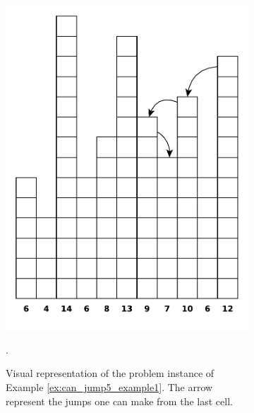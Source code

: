 \begin{figure}[t]
    \centering
    \begin{subfigure}[]{0.45\textwidth}
        \includegraphics[width=\textwidth]{sources/can_jump/images/can_jump4_example1}
        \caption[]
        {Visual representation of the problem instance  of Example
        \ref{ex:can_jump5_example1}. The arrow represent the jumps one can make from the last cell.}.
        \label{fig:can_jump5_example1}
     \end{subfigure}
    \hfill
    \begin{subfigure}[]{0.45\textwidth}

\end{subfigure}
\end{figure}
